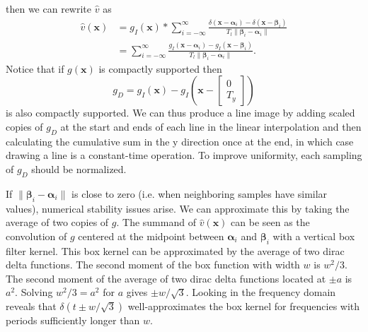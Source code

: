\documentclass{article}
\let\V\boldsymbol
\begin{document}
then we can rewrite $\hat v$ as
\begin{align*}
\hat v(\V x) &= g_I(\V x)*\sum_{i=-\infty}^{\infty}\frac{\delta(\V x - \V \alpha_i) - \delta(\V x - \V \beta_i)}{T_l\|\V\beta_i - \V\alpha_i\|}\\
&= \sum_{i=-\infty}^{\infty}\frac{g_I(\V x - \V \alpha_i) - g_I(\V x - \V \beta_i)}{T_l\|\V\beta_i - \V\alpha_i\|}.
\end{align*}
Notice that if $g(\V x)$ is compactly supported then
\[
g_D = g_I(\V x) - g_I\left(\V x - \begin{bmatrix}0\\T_y\end{bmatrix}\right)
\]
is also compactly supported.  We can thus produce a line image by adding scaled copies of $g_D$ at the start and ends of each line in the linear interpolation and then calculating the cumulative sum in the y direction once at the end, in which case drawing a line is a constant-time operation.  To improve uniformity, each sampling of $g_D$ should be normalized.

If $\|\V\beta_i - \V\alpha_i\|$ is close to zero (i.e. when neighboring samples have similar values), numerical stability issues arise.  We can approximate this by taking the average of two copies of $g$.  The summand of $\hat v(\V x)$ can be seen as the convolution of $g$ centered at the midpoint between $\V \alpha_i$ and $\V \beta_i$ with a vertical box filter kernel.  This box kernel can be approximated by the average of two dirac delta functions.  The second moment of the box function with width $w$ is $w^2/3$.  The second moment of the average of two dirac delta functions located at $\pm a$ is $a^2$.  Solving $w^2/3 = a^2$ for $a$ gives $\pm w/\sqrt{3}$.  Looking in the frequency domain reveals that $\delta(t \pm w/\sqrt{3})$ well-approximates the box kernel for frequencies with periods sufficiently longer than $w$.


\end{document}
